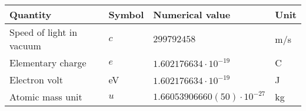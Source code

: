 \begin{tabular}{llll}
\hline
Quantity                 & Symbol & Numerical value                    & Unit \\
\hline
Speed of light in vacuum & $c$    & $299792458$                        & m/s  \\
Elementary charge        & $e$    & $1.602176634 \cdot 10^{-19}$       & C    \\
Electron volt            &  eV    & $1.602176634 \cdot 10^{-19}$       & J    \\
Atomic mass unit         & $u$    & $1.66053906660(50) \cdot 10^{-27}$ & kg   \\
\hline
\end{tabular}
